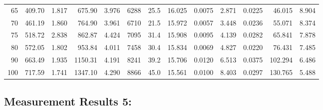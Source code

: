 \documentclass[10pt]{article}
\begin{document}
{\begin{tabular}{|r|rr|rr|rr|rr|rr|r|r|}
       65 &       409.70 &        1.817 &       675.90 &        3.976 &         6288 &         25.5 &       16.025 &       0.0075 &        2.871 &       0.0225 &       46.015 &        8.904 \\
       70 &       461.19 &        1.860 &       764.90 &        3.961 &         6710 &         21.5 &       15.972 &       0.0057 &        3.448 &       0.0236 &       55.071 &        8.374 \\
       75 &       518.72 &        2.838 &       862.87 &        4.424 &         7095 &         31.4 &       15.908 &       0.0095 &        4.139 &       0.0282 &       65.841 &        7.878 \\
       80 &       572.05 &        1.802 &       953.84 &        4.011 &         7458 &         30.4 &       15.834 &       0.0069 &        4.827 &       0.0220 &       76.431 &        7.485 \\
       90 &       663.49 &        1.935 &      1150.31 &        4.191 &         8241 &         39.2 &       15.706 &       0.0120 &        6.513 &       0.0375 &      102.294 &        6.486 \\
      100 &       717.59 &        1.741 &      1347.10 &        4.290 &         8866 &         45.0 &       15.561 &       0.0100 &        8.403 &       0.0297 &      130.765 &        5.488 \\
\hline
\end{tabular}
}



\subsection*{\large \bf Measurement Results 5:}
\end{document}
